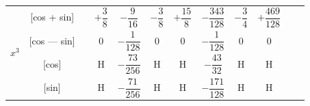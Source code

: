 \documentclass[11pt,a4paper]{book}
\begin{document}
\begin{center}
\begin{tabular}{|c|c|c|c|c|c|c|c|c|c|c|c|}
\hline
\multirow{4}{*}{$x^3$} & [cos + sin] & & $+\dfrac{3}{8}$ & $-\dfrac{9}{16}$ & $-\dfrac{3}{8}$ & $+\dfrac{15}{8}$ & $-\dfrac{343}{128}$ & $-\dfrac{3}{4}$ & $+\dfrac{469}{128}$ \\
& [cos --- sin] & & $0$ & $-\dfrac{1}{128}$ & $0$ & $0$ & $-\dfrac{1}{128}$ & $0$ & $0$ \\
& [cos] & & H & $-\dfrac{73}{256}$ & H & H & $-\dfrac{43}{32}$ & H & H \\
& [sin] & & H & $-\dfrac{71}{256}$ & H & H & $-\dfrac{171}{128}$ & H & H \\
\hline
\end{tabular}
\end{center}

\vspace{1em}

\end{document}
